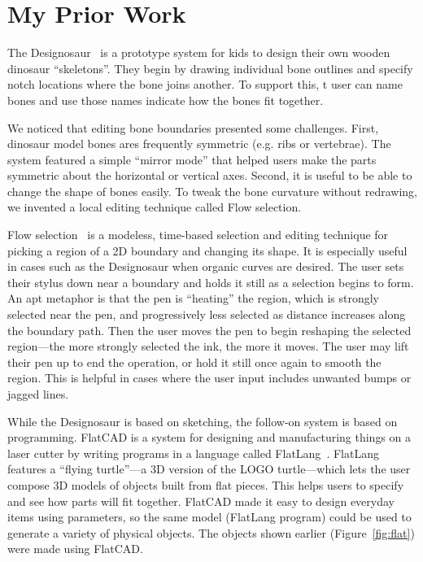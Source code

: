 \documentclass[12pt]{article}
\begin{document}
\section{My Prior Work}

The Designosaur~\cite{oh-fab} is a prototype system for kids to design
their own wooden dinosaur ``skeletons''. They begin by drawing
individual bone outlines and specify notch locations where the bone
joins another. To support this, t user can name bones and use those
names indicate how the bones fit together.

We noticed that editing bone boundaries presented some challenges.
First, dinosaur model bones ares frequently symmetric (e.g. ribs or
vertebrae). The system featured a simple ``mirror mode'' that helped
users make the parts symmetric about the horizontal or vertical axes.
Second, it is useful to be able to change the shape of bones
easily. To tweak the bone curvature without redrawing, we invented a
local editing technique called Flow selection.

Flow selection~\cite{johnson-flow-selection} is a modeless, time-based
selection and editing technique for picking a region of a 2D boundary
and changing its shape. It is especially useful in cases such as the
Designosaur when organic curves are desired. The user sets their
stylus down near a boundary and holds it still as a selection begins
to form. An apt metaphor is that the pen is ``heating'' the region,
which is strongly selected near the pen, and progressively less
selected as distance increases along the boundary path. Then the user
moves the pen to begin reshaping the selected region---the more
strongly selected the ink, the more it moves. The user may lift their
pen up to end the operation, or hold it still once again to smooth the
region. This is helpful in cases where the user input includes
unwanted bumps or jagged lines.

While the Designosaur is based on sketching, the follow-on system is
based on programming. FlatCAD is a system for designing and
manufacturing things on a laser cutter by writing programs in a
language called FlatLang~\cite{johnson-flatcad}.  FlatLang features a
``flying turtle''---a 3D version of the LOGO turtle---which lets the
user compose 3D models of objects built from flat pieces. This helps
users to specify and see how parts will fit together. FlatCAD made it
easy to design everyday items using parameters, so the same model
(FlatLang program) could be used to generate a variety of physical
objects. The objects shown earlier (Figure~\ref{fig:flat}) were made
using FlatCAD.
\end{document}

